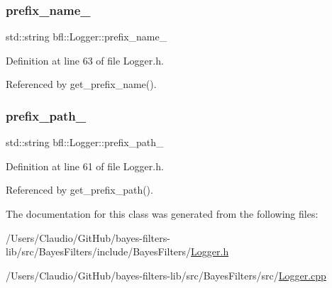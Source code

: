\subsubsection{\texorpdfstring{prefix\+\_\+name\+\_\+}{prefix\_name\_}}
{\footnotesize\ttfamily std\+::string bfl\+::\+Logger\+::prefix\+\_\+name\+\_\+\hspace{0.3cm}{\ttfamily [private]}}



Definition at line 63 of file Logger.\+h.



Referenced by get\+\_\+prefix\+\_\+name().

\mbox{\label{classbfl_1_1Logger_aa81c2aa16354c9a127957af1d38eb97f}} 
\subsubsection{\texorpdfstring{prefix\+\_\+path\+\_\+}{prefix\_path\_}}
{\footnotesize\ttfamily std\+::string bfl\+::\+Logger\+::prefix\+\_\+path\+\_\+\hspace{0.3cm}{\ttfamily [private]}}



Definition at line 61 of file Logger.\+h.



Referenced by get\+\_\+prefix\+\_\+path().



The documentation for this class was generated from the following files\+:\begin{DoxyCompactItemize}
\item 
/\+Users/\+Claudio/\+Git\+Hub/bayes-\/filters-\/lib/src/\+Bayes\+Filters/include/\+Bayes\+Filters/\mbox{\hyperlink{Logger_8h}{Logger.\+h}}\item 
/\+Users/\+Claudio/\+Git\+Hub/bayes-\/filters-\/lib/src/\+Bayes\+Filters/src/\mbox{\hyperlink{Logger_8cpp}{Logger.\+cpp}}\end{DoxyCompactItemize}
